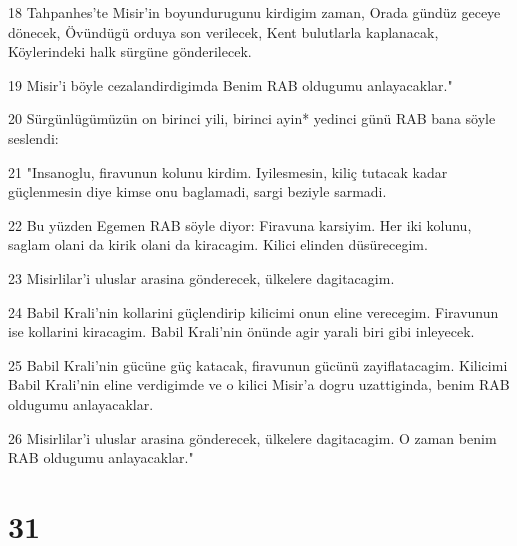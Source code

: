 \par 18 Tahpanhes'te Misir'in boyundurugunu kirdigim zaman, Orada gündüz geceye dönecek, Övündügü orduya son verilecek, Kent bulutlarla kaplanacak, Köylerindeki halk sürgüne gönderilecek.
\par 19 Misir'i böyle cezalandirdigimda Benim RAB oldugumu anlayacaklar."
\par 20 Sürgünlügümüzün on birinci yili, birinci ayin* yedinci günü RAB bana söyle seslendi:
\par 21 "Insanoglu, firavunun kolunu kirdim. Iyilesmesin, kiliç tutacak kadar güçlenmesin diye kimse onu baglamadi, sargi beziyle sarmadi.
\par 22 Bu yüzden Egemen RAB söyle diyor: Firavuna karsiyim. Her iki kolunu, saglam olani da kirik olani da kiracagim. Kilici elinden düsürecegim.
\par 23 Misirlilar'i uluslar arasina gönderecek, ülkelere dagitacagim.
\par 24 Babil Krali'nin kollarini güçlendirip kilicimi onun eline verecegim. Firavunun ise kollarini kiracagim. Babil Krali'nin önünde agir yarali biri gibi inleyecek.
\par 25 Babil Krali'nin gücüne güç katacak, firavunun gücünü zayiflatacagim. Kilicimi Babil Krali'nin eline verdigimde ve o kilici Misir'a dogru uzattiginda, benim RAB oldugumu anlayacaklar.
\par 26 Misirlilar'i uluslar arasina gönderecek, ülkelere dagitacagim. O zaman benim RAB oldugumu anlayacaklar."

\chapter{31}

